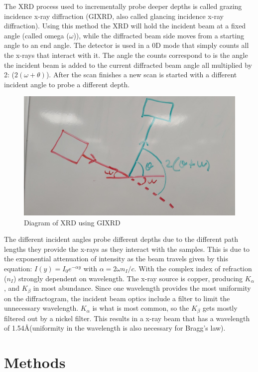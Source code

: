 \documentclass{article}
\begin{document}
    The XRD process used to incrementally probe deeper depths is called grazing incidence x-ray diffraction (GIXRD, also called glancing incidence x-ray diffraction). Using this method the XRD will hold the incident beam at a fixed angle (called omega ($\omega$)), while the diffracted beam side moves from a starting angle to an end angle. The detector is used in a 0D mode that simply counts all the x-rays that interact with it. The angle the counts correspond to is the angle the incident beam is added to the current diffracted beam angle all multiplied by 2: ($2(\omega+\theta)$). After the scan finishes a new scan is started with a different incident angle to probe a different depth.

\begin{figure}[H]
    \centering
    \includegraphics[width=.75\linewidth]{2theta scan diagram.jpg}
    \caption{Diagram of XRD using GIXRD}
    \label{fig:GIXRD diagram}
\end{figure}

    The different incident angles probe different depths due to the different path lengths they provide the x-rays as they interact with the samples. This is due to the exponential attenuation of intensity as the beam travels given by this equation: $I(y)=I_0e^{-\alpha y}$ with $\alpha=2\omega n_I/c$. With the complex index of refraction ($n_I$) strongly dependent on wavelength. The x-ray source is copper, producing $K_\alpha$, and $K_\beta$ in most abundance. Since one wavelength provides the most uniformity on the diffractogram, the incident beam optics include a filter to limit the unnecessary wavelength. $K_\alpha$ is what is most common, so the $K_\beta$ gets mostly filtered out by a nickel filter. This results in a x-ray beam that has a wavelength of 1.54\AA \space (uniformity in the wavelength is also necessary for Bragg's law).
    
\section{Methods}
\end{document}

